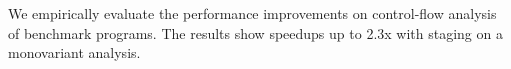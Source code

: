 We empirically evaluate the performance improvements on control-flow analysis of
benchmark programs. The results show speedups up to 2.3x with staging on a
monovariant analysis.
\fi

